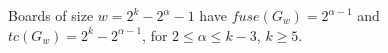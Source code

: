 \documentclass[12pt,letterpaper]{article}
\begin{document}
\begin{comment}\begin{prop}
  Boards of size $w=2^n-5$ have $tc(G_w)=2^n-2$ and $fuse(G_w)=2$.
\end{prop}
\begin{proof} %
  Consider the board after $2^{n-2}$ steps, by~\cref{Power2} we have that $G_w(2^{n-2})=2^{n-2}-3\cdot 0\oplus 1\oplus 2^{n-1}-1\cdot 0 \oplus 1\oplus 2^{n-2}-3\cdot 0$. By the same proposition and~\cref{OddBoardFirstEdge}, it will advance through the next $2^{n-2}-3$ steps without interacting with the edges. By the same logic as used in the proof of~\cref{Power2}, we conclude that $G_w(2^{n-1}-4) = 0\oplus 1\oplus 7\cdot 0\oplus 1\oplus 7 \cdot 0\oplus\cdots\oplus 1\oplus 7\cdot 0\oplus 1\oplus 0$, with enough repetitions to fill the board, that is, $((2^n-5)-3)/8 = (2^n-8)/8=2^{n-3}-1$ repititions. Then in two steps we get $000\oplus 1\oplus 000\oplus 1\oplus\cdots\oplus 000\oplus 1\oplus 000$, with $2^{n-2}-2$ 1s. And finally in two more steps this becomes $01\oplus 2^n-9\cdot 0 \oplus 10=G_w(2^{n-1})$. By~\cref{SymmetricAntipodeAll} we get the desired result. 
\end{proof} \end{comment}
\begin{prop}
  Boards of size $w=2^k-2^\alpha-1$ have $fuse(G_w)=2^{\alpha-1}$ and $tc(G_w)=2^k-2^{\alpha-1}$, for $2 \leq \alpha \leq k-3$, $k\geq 5$. 
\end{prop}
\end{document}
